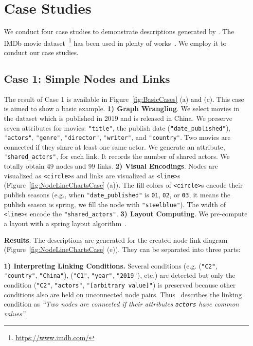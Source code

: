 \section{Case Studies}
We conduct four case studies to demonstrate descriptions generated by \ApproachName.
The IMDb movie dataset~\footnote{\url{https://www.imdb.com/}} has been used in plenty of works~\cite{DBLP:journals/tvcg/SrinivasanPEB18, DBLP:journals/pvldb/KrishnanWWFG16, DBLP:conf/ieeevast/BigelowNML19}.
We employ it to conduct our case studies.


\subsection{Case 1: Simple Nodes and Links}\label{sec:imdb_movies}
The result of Case 1 is available in Figure~\ref{fig:BasicCases} (a) and (c).
This case is aimed to show a basic example.
\textbf{1) Graph Wrangling}. We select movies in the dataset which is published in 2019 and is released in China.
We preserve seven attributes for movies: \texttt{"title"}, the publish date (\texttt{"date\_published"}), \texttt{"actors"}, \texttt{"genre"}, \texttt{"director"}, \texttt{"writer"}, and \texttt{"country"}.
Two movies are connected if they share at least one same actor.
We generate an attribute, \texttt{"shared\_actors"}, for each link. 
It records the number of shared actors.
We totally obtain 49 nodes and 99 links.
\textbf{2) Visual Encodings}. 
Nodes are visualized as \texttt{<circle>}s and links are visualized as \texttt{<line>}s (Figure~\ref{fig:NodeLineChartsCase} (a)).
The fill colors of \texttt{<circle>}s encode their publish seasons (e.g., when \texttt{"date\_published"} is \texttt{01}, \texttt{02}, or \texttt{03}, it means the publish season is spring, we fill the node with \texttt{"steelblue"}).
The width of \texttt{<line>}s encode the \texttt{"shared\_actors"}.
\textbf{3) Layout Computing}. 
We pre-compute a layout with a spring layout algorithm~\cite{DBLP:journals/spe/FruchtermanR91}.

\textbf{Results}.
The descriptions are generated for the created node-link diagram (Figure~\ref{fig:NodeLineChartsCase} (e)).
They can be separated into three parts:

\textbf{1) Interpreting Linking Conditions.} Several conditions (e.g. (\texttt{"C2"}, \texttt{"country"}, \texttt{"China"}), (\texttt{"C1"}, \texttt{"year"}, \texttt{"2019"}), etc.) are detected but only the condition (\texttt{"C2"}, \texttt{"actors"}, \texttt{"[arbitrary value]"}) is preserved because other conditions also are held on unconnected node pairs.
Thus \ApproachName~describes the linking condition as \textit{``Two nodes are connected if their attributes {\texttt{actors}} have common values''}.

